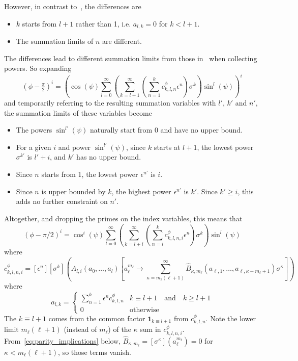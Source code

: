 \documentclass[a4paper]{amsart}
\begin{document}
However, in contrast to~\cite{Nilsson2025}, the differences are
\begin{itemize}
\item $k$ starts from $l+1$ rather than 1, i.e. $a_{l,k}=0$ for $k<l+1$.
\item The summation limits of $n$ are different.
\end{itemize}
The differences lead to different summation limits from those in~\cite{Nilsson2025} when collecting powers. So expanding
\begin{equation*}
(\phi-\tfrac{\pi}{2})^i = \left(\cos(\psi)\sum_{l=0}^{\infty}\left(
\sum^\infty_{k=l+1}
\left(\sum_{n=1}^kc^{\phi}_{k,l,n}\epsilon^n\right)\sigma^k\right)\sin^l(\psi)\right)^i
\end{equation*}
and temporarily referring to the resulting summation variables with $l'$, $k'$ and $n'$, the summation limits of these variables become
\begin{itemize}
\item The powers $\sin^{l'}(\psi)$ naturally start from 0 and have no upper bound.
\item For a given $i$ and power $\sin^{l'}(\psi)$, since $k$ starts at $l+1$, the lowest power $\sigma^{k'}$ is $l'+i$, and $k'$ has no upper bound.
\item Since $n$ starts from 1, the lowest power $\epsilon^{n'}$ is $i$.
\item Since $n$ is upper bounded by $k$, the highest power $\epsilon^{n'}$ is $k'$. Since $k'\geq i$, this adds no further constraint on $n'$.
\end{itemize}
Altogether, and dropping the primes on the index variables, this means that
\begin{equation}\label{eq:power_series}
(\phi-\pi/2)^i = \cos^i(\psi)\sum_{l=0}^{\infty}\left(
\sum_{k=l+i}^\infty\left(
\sum_{n=i}^kc^{\phi}_{k,l,n,i}
\epsilon^n\right)\sigma^{k}\right)\sin^l(\psi)
\end{equation}
where
\begin{equation*}
c^{\phi}_{k,l,n,i}=[\epsilon^n][\sigma^k]\left(A_ {l,i}(a_0,\dots,a_l)\left[a_\ell^{m_\ell}\rightarrow\!\!\!\sum_{\kappa=m_\ell(\ell+1)}^\infty \!\!\!\hat{B}_{\kappa,m_\ell}(a_{\ell,1},\dots,a_{\ell,\kappa-m_\ell+1})\sigma^\kappa\right]\right)
\end{equation*}
where
\begin{equation*}
a_{l,k} =
\begin{cases}
\sum_{n=1}^k
\epsilon^nc^{\phi}_{k,l,n} & k\equiv l+1 \quad\text{and}\quad k\geq l+1 \\
0 & \text{otherwise}
\end{cases}
\end{equation*}
The $k\equiv l+1$ comes from the common factor $\mathbf{1}_{k\equiv l+1}$ from $c^{\phi}_{k,l,n}$. Note the lower limit $m_\ell(\ell+1)$ (instead of $m_\ell$) of the $\kappa$ sum in $c^\phi_{k,l,n,i}$. From~\eqref{eq:parity_implications} below, $\hat{B}_{\kappa,m_\ell} = [\sigma^\kappa](a_\ell^{m_\ell}) = 0$ for $\kappa < m_\ell(\ell+1)$, so those terms vanish.
\end{document}
